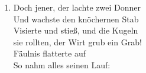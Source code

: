 \begin{guitarMagic}
\begin{enumerate}
        \item Doch jener, der lachte zwei Donner\\
            Und wachste den knöchernen Stab\\
            Visierte und stieß, und die Kugeln\\
            sie rollten, der Wirt grub ein Grab!\\
            Fäulnis flatterte auf\\
            So nahm alles seinen Lauf:
    \end{enumerate}
\end{guitarMagic}
